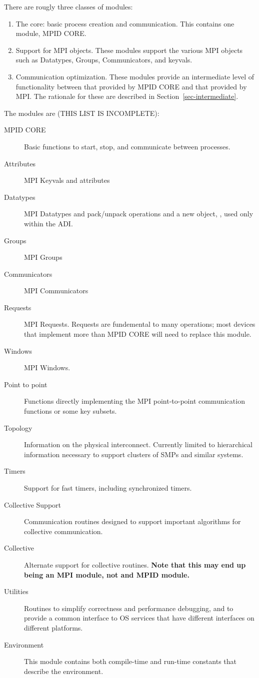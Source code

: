 \documentclass{article}
\begin{document}
There are rougly three classes of modules:
\begin{enumerate}
\item The core: basic process creation and communication. This
contains one module, MPID CORE. 
\item Support for MPI objects.  These modules support the various MPI
objects such as Datatypes, Groups, Communicators, and keyvals.
\item Communication optimization.  These modules provide an
intermediate level of functionality between that provided by MPID CORE
and that provided by MPI.  The rationale for these are described in
Section~\ref{sec-intermediate}. 
\end{enumerate}

The modules are (THIS LIST IS INCOMPLETE):
\begin{description}
\item[MPID CORE]Basic functions to start, stop, and communicate
between processes.
\item[Attributes]MPI Keyvals and attributes
\item[Datatypes]MPI Datatypes and pack/unpack operations and a new
object, , used only within the ADI.
\item[Groups]MPI Groups
\item[Communicators]MPI Communicators
\item[Requests]MPI Requests.  Requests are fundemental to many
operations; most devices that implement more than MPID CORE will need
to replace this module.
\item[Windows]MPI Windows.
\item[Point to point]Functions directly implementing the MPI
point-to-point communication functions or some key subsets.
\item[Topology]Information on the physical interconnect.  Currently
limited to hierarchical information necessary to support clusters of
SMPs and similar systems.
\item[Timers]Support for fast timers, including synchronized timers.
\item[Collective Support]Communication routines designed to support
important algorithms for collective communication.
\item[Collective]Alternate support for collective
routines. \textbf{Note that this may end up being an MPI module, not
and MPID module.}
\item[Utilities]Routines to simplify correctness and performance
debugging, and to provide a common interface to OS services that have
different interfaces on different platforms.
\item[Environment]This module contains both compile-time and run-time
constants that describe the environment. 
\end{description}
\end{document}
